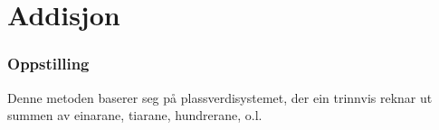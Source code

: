 




\section{Addisjon}

\subsubsection{Oppstilling}
Denne metoden baserer seg på plassverdisystemet, der ein trinnvis reknar ut summen av einarane, tiarane, hundrerane, o.l.

\begin{center}
	\parbox{0.3\linewidth}{
}\qquad
\parbox{0.3\linewidth}{
}\\[12pt]
\parbox{0.3\linewidth}{
}\qquad
\parbox{0.3\linewidth}{
}
\end{center}
